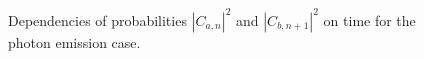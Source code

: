 \begin{figure}
\centering



\caption{Dependencies of probabilities $\left|C_{a, n}\right|^2$ and
  $\left|C_{b, n+1}\right|^2$ on time for the photon emission case.}
\label{fig:part1:rabi}
\end{figure}